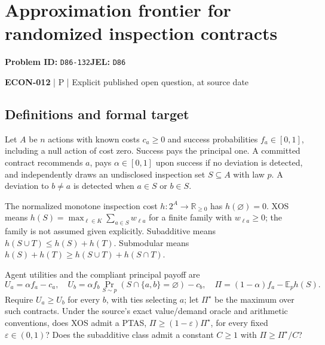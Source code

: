 \documentclass[11pt,a4paper]{article}
\begin{document}
\section*{Approximation frontier for randomized inspection contracts}
\textbf{Problem ID:} \texttt{D86-132}\quad \textbf{JEL:} \texttt{D86}\par
\label{problem:OP-0597}


\label{audited:ECON-012}

{\sffamily\small\color{muted}\textbf{ECON-012} | P | Explicit published open question, at source date\par}

\subsection*{Definitions and formal target}

Let \(A\) be \(n\) actions with known costs \(c_a\geq0\) and success probabilities \(f_a\in[0,1]\), including a null action of cost zero. Success pays the principal one. A committed contract recommends \(a\), pays \(\alpha\in[0,1]\) upon success if no deviation is detected, and independently draws an undisclosed inspection set \(S\subseteq A\) with law \(p\). A deviation to \(b\ne a\) is detected when \(a\in S\) or \(b\in S\).

The normalized monotone inspection cost \(h:2^A\to\mathbb R_{\geq0}\) has \(h(\varnothing)=0\). XOS means \(h(S)=\max_{\ell\in K}\sum_{a\in S}w_{\ell a}\) for a finite family with \(w_{\ell a}\geq0\); the family is not assumed given explicitly. Subadditive means \(h(S\cup T)\leq h(S)+h(T)\). Submodular means \(h(S)+h(T)\geq h(S\cup T)+h(S\cap T)\).

Agent utilities and the compliant principal payoff are
\[
 U_a=\alpha f_a-c_a,\quad
 U_b=\alpha f_b\Pr_{S\sim p}(S\cap\{a,b\}=\varnothing)-c_b,\quad
 \Pi=(1-\alpha)f_a-\mathbb E_p h(S).
\]
Require \(U_a\geq U_b\) for every \(b\), with ties selecting \(a\); let \(\Pi^\star\) be the maximum over such contracts. Under the source's exact value/demand oracle and arithmetic conventions, does XOS admit a PTAS, \(\Pi\geq(1-\varepsilon)\Pi^\star\), for every fixed \(\varepsilon\in(0,1)\)? Does the subadditive class admit a constant \(C\geq1\) with \(\Pi\geq\Pi^\star/C\)?
\end{document}
